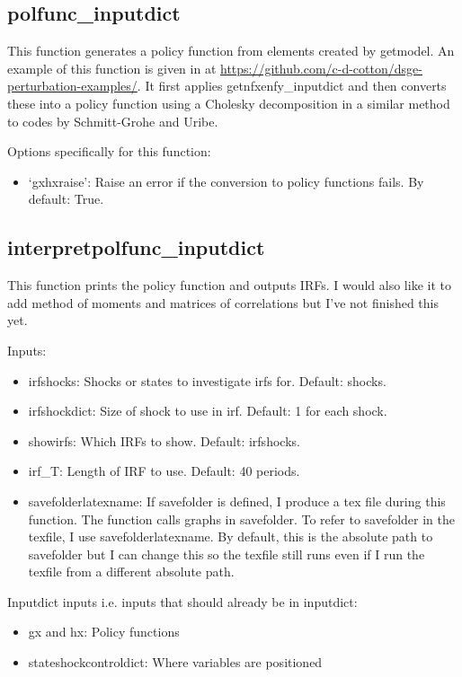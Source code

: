 \documentclass{article}
\theoremstyle{definition}
\begin{document}
\subsection{polfunc\_inputdict}
This function generates a policy function from elements created by getmodel. An example of this function is given in  at \url{https://github.com/c-d-cotton/dsge-perturbation-examples/}. It first applies getnfxenfy\_inputdict and then converts these into a policy function using a Cholesky decomposition in a similar method to codes by Schmitt-Grohe and Uribe.

Options specifically for this function:
\begin{itemize}
    \item `gxhxraise': Raise an error if the conversion to policy functions fails. By default: True.
\end{itemize}

\subsection{interpretpolfunc\_inputdict}
This function prints the policy function and outputs IRFs. I would also like it to add method of moments and matrices of correlations but I've not finished this yet.

Inputs:
\begin{itemize}
    \item irfshocks: Shocks or states to investigate irfs for. Default: shocks.
    \item irfshockdict: Size of shock to use in irf. Default: 1 for each shock.
    \item showirfs: Which IRFs to show. Default: irfshocks.
    \item irf\_T: Length of IRF to use. Default: 40 periods.
    \item savefolderlatexname: If savefolder is defined, I produce a tex file during this function. The function calls graphs in savefolder. To refer to savefolder in the texfile, I use savefolderlatexname. By default, this is the absolute path to savefolder but I can change this so the texfile still runs even if I run the texfile from a different absolute path.
\end{itemize}

Inputdict inputs i.e. inputs that should already be in inputdict:
\begin{itemize}
    \item gx and hx: Policy functions
    \item stateshockcontroldict: Where variables are positioned
\end{itemize}
\end{document}

